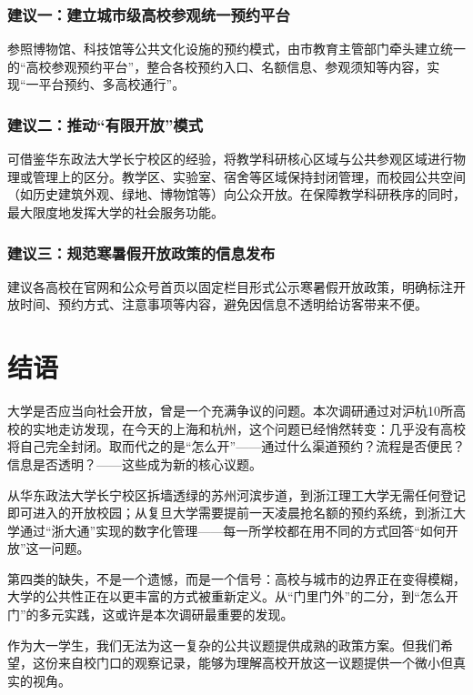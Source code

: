 \documentclass[12pt]{article}
\begin{document}
\subsubsection{建议一：建立城市级高校参观统一预约平台}

参照博物馆、科技馆等公共文化设施的预约模式，由市教育主管部门牵头建立统一的“高校参观预约平台”，整合各校预约入口、名额信息、参观须知等内容，实现“一平台预约、多高校通行”。

\subsubsection{建议二：推动“有限开放”模式}

可借鉴华东政法大学长宁校区的经验，将教学科研核心区域与公共参观区域进行物理或管理上的区分。教学区、实验室、宿舍等区域保持封闭管理，而校园公共空间（如历史建筑外观、绿地、博物馆等）向公众开放。在保障教学科研秩序的同时，最大限度地发挥大学的社会服务功能。

\subsubsection{建议三：规范寒暑假开放政策的信息发布}

建议各高校在官网和公众号首页以固定栏目形式公示寒暑假开放政策，明确标注开放时间、预约方式、注意事项等内容，避免因信息不透明给访客带来不便。


\section{结语}

大学是否应当向社会开放，曾是一个充满争议的问题。本次调研通过对沪杭10所高校的实地走访发现，在今天的上海和杭州，这个问题已经悄然转变：几乎没有高校将自己完全封闭。取而代之的是“怎么开”——通过什么渠道预约？流程是否便民？信息是否透明？——这些成为新的核心议题。

从华东政法大学长宁校区拆墙透绿的苏州河滨步道，到浙江理工大学无需任何登记即可进入的开放校园；从复旦大学需要提前一天凌晨抢名额的预约系统，到浙江大学通过“浙大通”实现的数字化管理——每一所学校都在用不同的方式回答“如何开放”这一问题。

第四类的缺失，不是一个遗憾，而是一个信号：高校与城市的边界正在变得模糊，大学的公共性正在以更丰富的方式被重新定义。从“门里门外”的二分，到“怎么开门”的多元实践，这或许是本次调研最重要的发现。

作为大一学生，我们无法为这一复杂的公共议题提供成熟的政策方案。但我们希望，这份来自校门口的观察记录，能够为理解高校开放这一议题提供一个微小但真实的视角。
\end{document}
